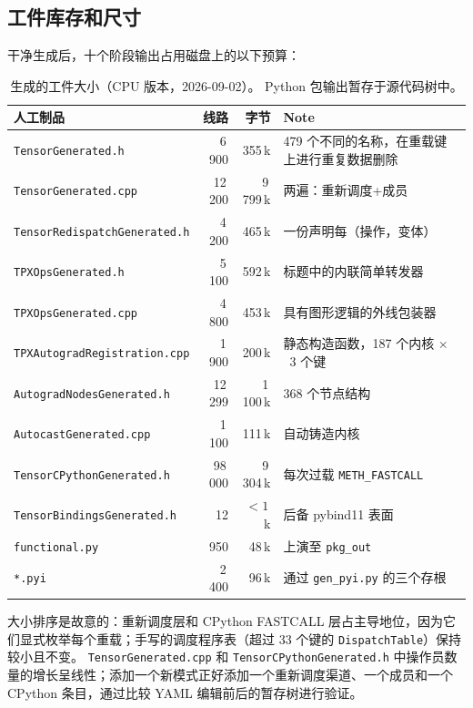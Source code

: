 \subsection{工件库存和尺寸}

干净生成后，十个阶段输出占用磁盘上的以下预算：

\begin{table}[H]
\centering
\caption{生成的工件大小（CPU 版本，2026-09-02）。 Python 包输出暂存于源代码树中。}
\label{tab:codegen_sizes}
\small
\begin{tabular}{lrrl}
\toprule
人工制品 & 线路 & 字节 & Note \\
\midrule
\texttt{TensorGenerated.h} & 6\,900 & 355\,k & 479 个不同的名称，在重载键上进行重复数据删除 \\
\texttt{TensorGenerated.cpp} & 12\,200 & 9\,799\,k & 两遍：重新调度+成员 \\
\texttt{TensorRedispatchGenerated.h} & 4\,200 & 465\,k & 一份声明每（操作，变体） \\
\texttt{TPXOpsGenerated.h} & 5\,100 & 592\,k & 标题中的内联简单转发器 \\
\texttt{TPXOpsGenerated.cpp} & 4\,800 & 453\,k & 具有图形逻辑的外线包装器 \\
\texttt{TPXAutogradRegistration.cpp} & 1\,900 & 200\,k & 静态构造函数，187 个内核 $\times$~3 个键 \\
\texttt{AutogradNodesGenerated.h} & 12\,299 & 1\,100\,k & 368 个节点结构 \\
\texttt{AutocastGenerated.cpp} & 1\,100 & 111\,k & 自动铸造内核 \\
\texttt{TensorCPythonGenerated.h} & 98\,000 & 9\,304\,k & 每次过载 \texttt{METH\_FASTCALL} \\
\texttt{TensorBindingsGenerated.h} & 12 & $<1$\,k & 后备 pybind11 表面 \\
\texttt{functional.py} & 950 & 48\,k & 上演至 \texttt{pkg\_out} \\
\texttt{*.pyi} & 2\,400 & 96\,k & 通过 \texttt{gen\_pyi.py} 的三个存根 \\
\bottomrule
\end{tabular}
\end{table}

大小排序是故意的：重新调度层和 CPython FASTCALL 层占主导地位，因为它们显式枚举每个重载；手写的调度程序表（超过 33 个键的 \texttt{DispatchTable}）保持较小且不变。 \texttt{TensorGenerated.cpp} 和 \texttt{TensorCPythonGenerated.h} 中操作员数量的增长呈线性；添加一个新模式正好添加一个重新调度渠道、一个成员和一个 CPython 条目，通过比较 YAML 编辑前后的暂存树进行验证。

